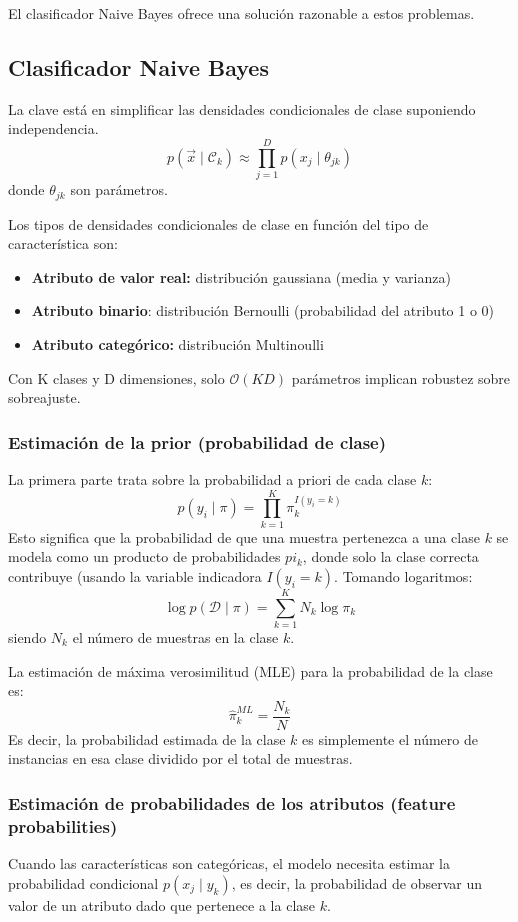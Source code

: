 El clasificador Naive Bayes ofrece una solución razonable a estos problemas.

\subsection{Clasificador Naive Bayes}
La clave está en simplificar las densidades condicionales de clase suponiendo independencia.
$$p(\vec{x} \mid \mathcal{C}_k) \approx \prod^D_{j = 1} p(x_j \mid \theta_{jk})$$
donde $\theta_{jk}$ son parámetros. 

Los tipos de densidades condicionales de clase en función del tipo de característica son:
\begin{itemize}
\item \textbf{Atributo de valor real:} distribución gaussiana (media y varianza)
\item \textbf{Atributo binario}: distribución Bernoulli (probabilidad del atributo 1 o 0)
\item \textbf{Atributo categórico:} distribución Multinoulli
\end{itemize}

Con K clases y D dimensiones, solo $\mathcal{O}(KD)$ parámetros implican robustez sobre sobreajuste.

\subsubsection{Estimación de la prior (probabilidad de clase)}
La primera parte trata sobre la probabilidad a priori de cada clase $k$:
$$p(y_i \mid \pi) = \prod^K_{k=1} \pi_k^{I(y_i = k)}$$
Esto significa que la probabilidad de que una muestra pertenezca a una clase $k$ se modela como un producto de probabilidades $pi_k$, donde solo la clase correcta contribuye (usando la variable indicadora $I(y_i = k)$. Tomando logaritmos:
$$\log p(\mathcal{D} \mid \pi) = \sum^K_{k = 1} N_k \log \pi_k$$
siendo $N_k$ el número de muestras en la clase $k$.

La estimación de máxima verosimilitud (MLE) para la probabilidad de la clase es:
$$\hat{\pi}_k^{ML} = \frac{N_k}{N}$$
Es decir, la probabilidad estimada de la clase $k$ es simplemente el número de instancias en esa clase dividido por el total de muestras.

\subsubsection{Estimación de probabilidades de los atributos (feature probabilities)}
Cuando las características son categóricas, el modelo necesita estimar la probabilidad condicional $p(x_j \mid y_k)$, es decir, la probabilidad de observar un valor de un atributo dado que pertenece a la clase $k$.

